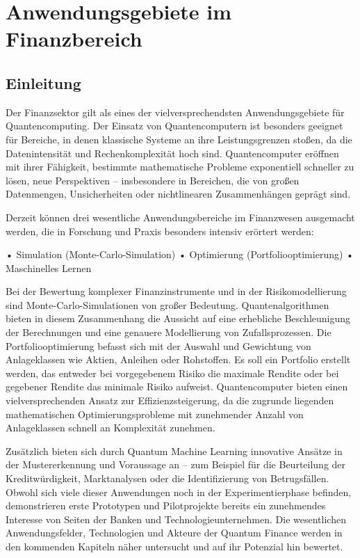\chapter{Anwendungsgebiete im Finanzbereich}
\label{trends} %



\section{Einleitung}
Der Finanzsektor gilt als eines der vielversprechendsten Anwendungsgebiete für Quantencomputing. Der Einsatz von Quantencomputern ist besonders geeignet für Bereiche, in denen klassische Systeme an ihre Leistungsgrenzen stoßen, da die Datenintensität und Rechenkomplexität hoch sind. Quantencomputer eröffnen mit ihrer Fähigkeit, bestimmte mathematische Probleme exponentiell schneller zu lösen, neue Perspektiven – insbesondere in Bereichen, die von großen Datenmengen, Unsicherheiten oder nichtlinearen Zusammenhängen geprägt sind.

Derzeit können drei wesentliche Anwendungsbereiche im Finanzwesen ausgemacht werden, die in Forschung und Praxis besonders intensiv erörtert werden:

• Simulation (Monte-Carlo-Simulation)
• Optimierung (Portfoliooptimierung)
• Maschinelles Lernen
 
Bei der Bewertung komplexer Finanzinstrumente und in der Risikomodellierung sind Monte-Carlo-Simulationen von großer Bedeutung. Quantenalgorithmen bieten in diesem Zusammenhang die Aussicht auf eine erhebliche Beschleunigung der Berechnungen und eine genauere Modellierung von Zufallsprozessen.
Die Portfoliooptimierung befasst sich mit der Auswahl und Gewichtung von Anlageklassen wie Aktien, Anleihen oder Rohstoffen. Es soll ein Portfolio erstellt werden, das entweder bei vorgegebenem Risiko die maximale Rendite oder bei gegebener Rendite das minimale Risiko aufweist. Quantencomputer bieten einen vielversprechenden Ansatz zur Effizienzsteigerung, da die zugrunde liegenden mathematischen Optimierungsprobleme mit zunehmender Anzahl von Anlageklassen schnell an Komplexität zunehmen.

Zusätzlich bieten sich durch Quantum Machine Learning innovative Ansätze in der Mustererkennung und Voraussage an – zum Beispiel für die Beurteilung der Kreditwürdigkeit, Marktanalysen oder die Identifizierung von Betrugsfällen. Obwohl sich viele dieser Anwendungen noch in der Experimentierphase befinden, demonstrieren erste Prototypen und Pilotprojekte bereits ein zunehmendes Interesse von Seiten der Banken und Technologieunternehmen.
Die wesentlichen Anwendungsfelder, Technologien und Akteure der Quantum Finance werden in den kommenden Kapiteln näher untersucht und auf ihr Potenzial hin bewertet.


